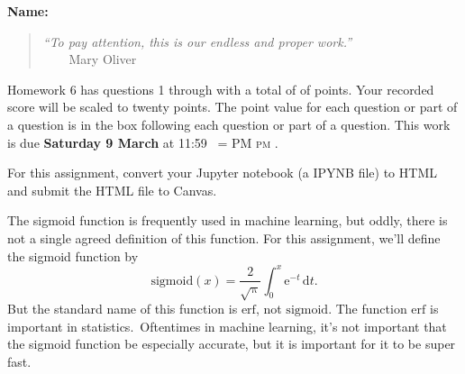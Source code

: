 \documentclass[12pt,fleqn]{exam}
\makeatletter
\newcommand{\sigmoid}{\mathrm{sigmoid}}
\newcommand{\erf}{\mathrm{erf}}
\newcommand{\quiz}{6}
\newcommand{\term}{Spring}
\DeclareRobustCommand{\maybefakesc}[1]{%
  \ifnum\pdfstrcmp{\f@series}{\bfdefault}=\z@
    {\fontsize{\dimexpr0.8\dimexpr\f@size pt\relax}{0}\selectfont\uppercase{#1}}%
  \else
    \textsc{#1}%
  \fi
}
\newcommand\PM{\,\maybefakesc{pm}\xspace}
\makeatother
\begin{document}
\vspace{0.1in}
\noindent{}
{\bf Name:}  \\
\noindent \makebox[3.0truein][l]{\textbf{Homework \quiz, \term \/ \the\year}}
\vspace{0.1in}

\begin{quote}
\noindent \emph{“To pay attention, this is our endless and proper work.”} \\ $\phantom{xxx} $ \hfill {\sc Mary Oliver}
\end{quote}

\noindent  Homework \quiz\/  has questions 1 through  \numquestions \/ with a total of of  \numpoints\/  points. 
Your recorded score will be scaled to twenty points. The point
value for each question or part of a question is in the box following each question or part of a question.
This work is due \textbf{Saturday 9 March  } at 11:59 \PM.  

For this assignment, convert your Jupyter notebook (a IPYNB file)  to HTML and submit the HTML file to Canvas.

The sigmoid function is frequently used in machine learning, but oddly, there is not a single agreed definition of this function.
For this assignment, we'll define the sigmoid function by
\begin{equation}
  \sigmoid(x) = \frac{2}{\sqrt{\uppi}} \int_0^x \mathrm{e}^{-t} \, \mathrm{d} t.
\end{equation}
But the standard name of this function is $\erf$, not $\sigmoid$.  The function $\erf$ is important in statistics.\
Oftentimes in machine learning, it's not important that the sigmoid function be especially accurate, but it is 
important for it to be super fast.
\end{document}
